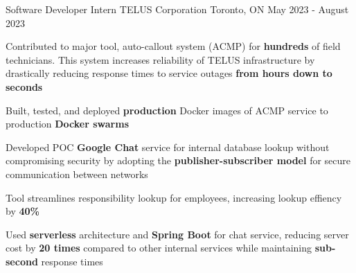 \begin{cventries}
	\cventry
	{Software Developer Intern} %
	{TELUS Corporation} %
	{Toronto, ON} %
	{May 2023 - August 2023} %
	{
		\begin{cvitems} %
			\item {Contributed to major tool, auto-callout system (ACMP) for \textbf{hundreds} of field technicians. This system increases reliability of TELUS infrastructure by drastically reducing response times to service outages \textbf{from hours down to seconds}}
			\item {Built, tested, and deployed \textbf{production} Docker images of ACMP service to production \textbf{Docker swarms}}
			\item {Developed POC \textbf{Google Chat} service for internal database lookup without compromising security by adopting the \textbf{publisher-subscriber model} for secure communication between networks}
			\item {Tool streamlines responsibility lookup for employees, increasing lookup effiency by \textbf{40\%}}
			\item {Used \textbf{serverless} architecture and \textbf{Spring Boot} for chat service, reducing server cost by \textbf{20 times} compared to other internal services while maintaining \textbf{sub-second} response times}
		\end{cvitems}
	}


\end{cventries}
